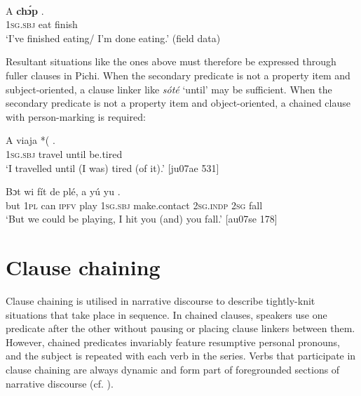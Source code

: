 \ea%
    \label{ex:key:1608}
\\
    \gll A    \textbf{chɔ́p}  .\\
\textsc{1sg.sbj}  eat    finish  \\

\glt ‘I’ve finished eating/ I’m done eating.’ (field data)
\z

Resultant situations like the ones above must therefore be expressed through fuller clauses in Pichi. When the secondary predicate is not a property item and subject-oriented, a clause linker like \textit{sóté} ‘until’ may be sufficient. When the secondary predicate is not a property item and object-oriented, a chained clause with person-marking is required:


\ea%
    \label{ex:key:1609}
    \gll A    viaja  *(\textstylePichiexamplebold{\textmd{)}}  .\\
\textsc{1sg.sbj}  travel   until  be.tired\\

\glt ‘I travelled until (I was) tired (of it).’ [ju07ae 531]
\z


\ea%
    \label{ex:key:1610}
    \gll Bɔt  wi  fít  de  plé,  a            yú    yu  .\\
but  \textsc{1pl}  can  \textsc{ipfv}  play  \textsc{1sg.sbj}  make.contact    \textsc{2sg.indp}  \textsc{2sg}  fall\\

\glt ‘But we could be playing, I hit you (and) you fall.’ [au07se 178]
\z

\section{Clause chaining}\label{sec:11.4}

Clause chaining is utilised in narrative discourse to describe tightly-knit situations that take place in sequence. In chained clauses, speakers use one predicate after the other without pausing or placing clause linkers between them. However, chained predicates invariably feature resumptive personal pronouns, and the subject is repeated with each verb in the series. Verbs that participate in clause chaining are always dynamic and form part of foregrounded sections of narrative discourse (cf. ).


